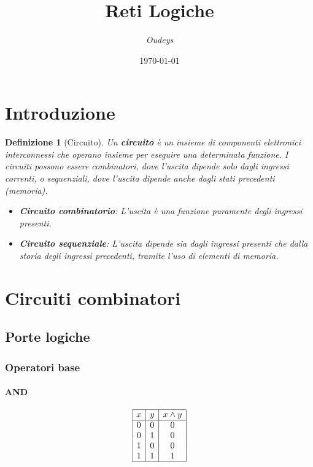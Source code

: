 \documentclass[a4paper,12pt]{article}
\title{\textbf{Reti Logiche}}
\author{\textit{Oudeys}}
\date{\today}
\theoremstyle{mystyle}
\newtheorem{definition}[theorem]{Definizione}
\begin{document}
\maketitle



\tableofcontents
\newpage

\section{Introduzione}
\begin{definition}[Circuito]
    Un \textbf{circuito} è un insieme di componenti elettronici interconnessi che operano insieme per eseguire una determinata funzione. I circuiti possono essere combinatori, dove l'uscita dipende solo dagli ingressi correnti, o sequenziali, dove l'uscita dipende anche dagli stati precedenti (memoria). 
    \begin{itemize}
        \item \textbf{Circuito combinatorio}: L'uscita è una funzione puramente degli ingressi presenti.
        \item \textbf{Circuito sequenziale}: L'uscita dipende sia dagli ingressi presenti che dalla storia degli ingressi precedenti, tramite l'uso di elementi di memoria.
    \end{itemize}
\end{definition}

\section{Circuiti combinatori}
\subsection{Porte logiche}

\subsubsection{Operatori base}

\paragraph{AND}
\[
\begin{array}{|c|c|c|}
\hline
x & y & x \land y \\
\hline
0 & 0 & 0 \\
0 & 1 & 0 \\
1 & 0 & 0 \\
1 & 1 & 1 \\
\hline
\end{array}
\]
\end{document}

